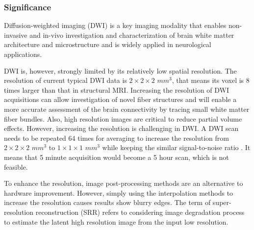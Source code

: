 \subsubsection{Significance}

Diffusion-weighted imaging (DWI) is a key imaging modality that enables non-invasive and in-vivo investigation and characterization of brain white matter architecture and microstructure and is widely applied in neurological applications.

DWI is, however, strongly limited by its relatively low spatial resolution. The resolution of current typical DWI data is $2 \times 2 \times 2$  $mm^3$, that means its voxel is $8$ times larger than that in structural MRI. 
Increasing the resolution of DWI acquisitions can allow investigation of novel fiber structures and will enable a more accurate assessment of the brain connectivity by tracing small white matter fiber bundles. Also, high resolution images are critical to reduce partial volume effects. 
However, increasing the resolution is challenging in DWI. A DWI scan needs to be repeated 64 times for averaging to increase the resolution from $2 \times 2 \times 2$ $mm^3$ to $1 \times 1 \times 1$ $mm^3$ while keeping the similar signal-to-noise ratio \cite{brown2014}. It means that 5 minute acquisition would become a 5 hour scan, which is not feasible. 

To enhance the resolution, image post-processing methods are an alternative to hardware improvement.
However, simply using the interpolation methods to increase the resolution causes results show blurry edges.
The term of super-resolution reconstruction (SRR) refers to considering image degradation process to estimate the latent high resolution image from the input low resolution.

